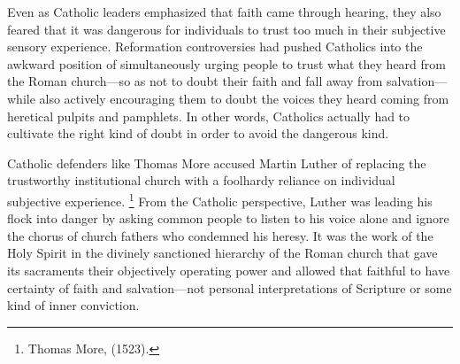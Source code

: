 Even as Catholic leaders emphasized that faith came through hearing, they also
feared that it was dangerous for individuals to trust too much in their
subjective sensory experience.
Reformation controversies had pushed Catholics into the awkward position of
simultaneously urging people to trust what they heard from the Roman
church---so as not to doubt their faith and fall away from salvation---while
also actively encouraging them to doubt the voices they heard coming from
heretical pulpits and pamphlets.
In other words, Catholics actually had to cultivate the right kind of doubt in
order to avoid the dangerous kind.

Catholic defenders like Thomas More accused Martin Luther of replacing the
trustworthy institutional church with a foolhardy reliance on individual
subjective experience.%
    \footnote{Thomas More,  (1523).}
From the Catholic perspective, Luther was leading his flock into danger by
asking common people to listen to his voice alone and ignore the chorus of
church fathers who condemned his heresy.
It was the work of the Holy Spirit in the divinely sanctioned hierarchy of the
Roman church that gave its sacraments their objectively operating power and
allowed that faithful to have certainty of faith and salvation---not personal
interpretations of Scripture or some kind of inner conviction.%
    \Autocite[131--208]{Schreiner:Certainty}

